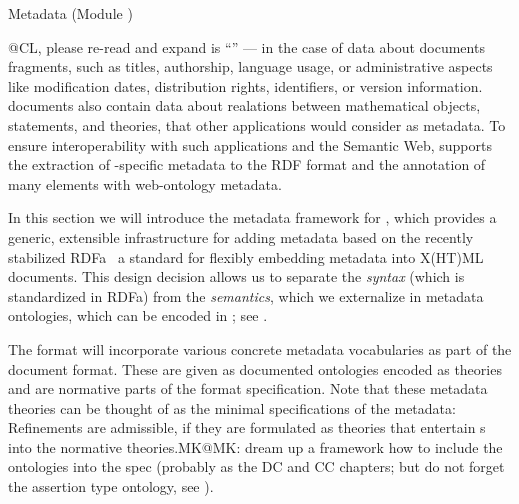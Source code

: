 
\begin{module}[id=genmeta]
\begin{omgroup}[creators={miko,clange},short={Metadata},id=metadatachap]
  {Metadata (Module {})}

\begin{newpart}{@CL, please re-read and expand}
   is ``{}'' --- in the case of
  {\omdoc} data about documents fragments, such as titles, authorship, language usage, or
  administrative aspects like modification dates, distribution rights, identifiers, or
  version information. {\omdoc} documents also contain data about realations between
  mathematical objects, statements, and theories, that other applications would consider
  as metadata. To ensure interoperability with such applications and the Semantic Web,
  {\omdoc} supports the extraction of {\omdoc}-specific metadata to the RDF
  format and the annotation of many {\omdoc} elements with web-ontology
  metadata.

  In this section we will introduce the metadata framework for {},
  which provides a generic, extensible infrastructure for adding metadata based on the
  recently stabilized RDFa~\cite{AdidaEtAl08:RDFa} a standard for flexibly embedding
  metadata into X(HT)ML documents. This design decision allows us to separate the
  {\emph{syntax}} (which is standardized in RDFa) from the {\emph{semantics}}, which we
  externalize in metadata ontologies, which can be encoded in {\omdoc}; see
  {}.



  The {\omdoc} format will incorporate various concrete metadata vocabularies as part of
  the document format. These are given as documented ontologies encoded as {\omdoc}
  theories and are normative parts of the format specification. Note that these metadata
  theories can be
  thought of as the minimal specifications of the metadata: Refinements are admissible, if
  they are formulated as {\omdoc} theories that entertain {}s into the
  normative theories.{MK@MK: dream up a framework how to include the ontologies into the
    spec (probably as the DC and CC chapters; but do not forget the assertion type
    ontology, see ).}


\end{newpart}
\end{omgroup}
\end{module}
